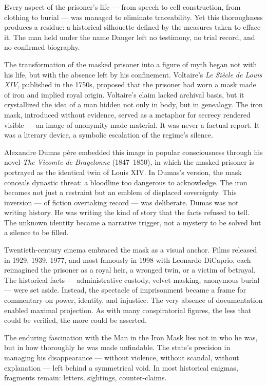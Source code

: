 Every aspect of the prisoner's life — from speech to cell construction, from clothing to burial — was managed to eliminate traceability. Yet this thoroughness produces a residue: a historical silhouette defined by the measures taken to efface it. The man held under the name Dauger left no testimony, no trial record, and no confirmed biography. 

The transformation of the masked prisoner into a figure of myth began not with his life, but with the absence left by his confinement. Voltaire’s \textit{Le Siècle de Louis XIV}, published in the 1750s, proposed that the prisoner had worn a mask made of iron and implied royal origin. Voltaire’s claim lacked archival basis, but it crystallized the idea of a man hidden not only in body, but in genealogy. The iron mask, introduced without evidence, served as a metaphor for secrecy rendered visible — an image of anonymity made material. It was never a factual report. It was a literary device, a symbolic escalation of the regime's silence.

Alexandre Dumas père embedded this image in popular consciousness through his novel \textit{The Vicomte de Bragelonne} (1847–1850), in which the masked prisoner is portrayed as the identical twin of Louis XIV. In Dumas’s version, the mask conceals dynastic threat: a bloodline too dangerous to acknowledge. The iron becomes not just a restraint but an emblem of displaced sovereignty. This inversion — of fiction overtaking record — was deliberate. Dumas was not writing history. He was writing the kind of story that the facts refused to tell. The unknown identity became a narrative trigger, not a mystery to be solved but a silence to be filled.

Twentieth-century cinema embraced the mask as a visual anchor. Films released in 1929, 1939, 1977, and most famously in 1998 with Leonardo DiCaprio, each reimagined the prisoner as a royal heir, a wronged twin, or a victim of betrayal. The historical facts — administrative custody, velvet masking, anonymous burial — were set aside. Instead, the spectacle of imprisonment became a frame for commentary on power, identity, and injustice. The very absence of documentation enabled maximal projection. As with many conspiratorial figures, the less that could be verified, the more could be asserted.

The enduring fascination with the Man in the Iron Mask lies not in who he was, but in how thoroughly he was made unfindable. The state's precision in managing his disappearance — without violence, without scandal, without explanation — left behind a symmetrical void. In most historical enigmas, fragments remain: letters, sightings, counter-claims.

